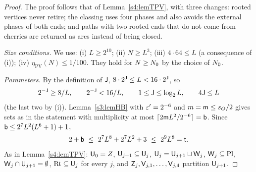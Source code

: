 \begin{proof}
The proof follows that of Lemma~\ref{s4:lemTPV}, with three changes: rooted vertices never retire; the classing uses
four phases and also avoids the external phases of both ends; and paths with two rooted ends that do not come from
cherries are returned as arcs instead of being closed.

\emph{Size conditions.} We use: (i) $L\ge2^{10}$; (ii) $N\ge L^3$; (iii) $4\cdot64\le L$ (a consequence of (i)); (iv)
$\eta_{\mathrm{PV}}(N)\le1/100$. They hold for $N\ge N_{0}$ by the choice of $N_{0}$.

\emph{Parameters.} By the definition of $\mathsf{J}$, $8\cdot2^{\mathsf{J}}\le L<16\cdot2^{\mathsf{J}}$, so
\begin{equation}\label{s4:eqPVJ}
2^{-\mathsf{J}}\ge8/L,\qquad 2^{-\mathsf{J}}<16/L,\qquad 1\le\mathsf{J}\le\log_2L,\qquad 4\mathsf{J}\le L
\end{equation}
(the last two by (i)). Lemma~\ref{s3:lemHB} with $\varepsilon'=2^{-6}$ and $m=\mathsf{m}\le s_O/2$ gives sets as in the statement
with multiplicity at most $\lceil2\mathsf{m} L^2/2^{-6}\rceil=\mathsf{b}$. Since $\mathsf{b}\le2^7L^2(L^6+1)+1$,
\begin{equation}\label{s4:eqPVt}
2+\mathsf{b}\ \le\ 2^7L^8+2^7L^2+3\ \le\ 2^9L^8=\mathsf{t} .
\end{equation}
As in Lemma~\ref{s4:lemTPV}: $\mathsf{U}_0=Z$, $\mathsf{U}_{j+1}\subseteq\mathsf{U}_j$, $\mathsf{U}_j=\mathsf{U}_{j+1}\sqcup\mathsf{W}_j$,
$\mathsf{W}_j\subseteq\mathrm{Pl}$, $\mathsf{W}_j\cap\mathsf{U}_{j+1}=\emptyset$, $\mathrm{Rt}\subseteq\mathsf{U}_j$ for every $j$, and
$\mathsf{Z}_j,\mathsf{V}_{j,1},\dots,\mathsf{V}_{j,4}$ partition $\mathsf{U}_{j+1}$.


\end{proof}
